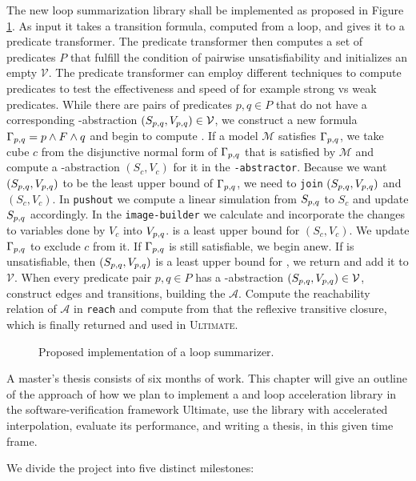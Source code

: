 
The new \qvasrs loop summarization library shall be implemented as proposed in Figure \ref{fig}. As input it takes a transition formula, computed from a loop, and gives it to a predicate transformer. The predicate transformer then computes a set of predicates $P$ that fulfill the condition of pairwise unsatisfiability and initializes an empty \qvasrs $\mathcal{V}$. The predicate transformer can employ different techniques to compute predicates to test the effectiveness and speed of for example strong vs weak predicates. While there are pairs of predicates $p, q \in P$ that do not have a corresponding \qvasr-abstraction $(S_{p, q}, V_{p, q}) \in \mathcal{V}$, we construct a new formula $\Gamma_{p, q} = p\land F \land q$ and begin to compute \pqvasr. If a model $\mathcal{M}$ satisfies $\Gamma_{p, q}$, we take cube $c$ from the disjunctive normal form of $\Gamma_{p, q}$ that is satisfied by $\mathcal{M}$ and compute a \qvasr-abstraction $(S_c, V_c)$ for it in the \texttt{\qvasr-abstractor}. Because we want $(S_{p, q}, V_{p, q})$ to be the least upper bound of $\Gamma_{p, q}$, we need to \texttt{join} $(S_{p, q}, V_{p, q})$ and $(S_c, V_c)$. In \texttt{pushout} we compute a linear simulation from $S_{p, q}$ to $S_c$ and update $S_{p, q}$ accordingly. In the \texttt{image-builder} we calculate and incorporate the changes to variables done by $V_c$ into $V_{p, q}$. \pqvasr is a least upper bound for $(S_c, V_c)$. We update $\Gamma_{p, q}$ to exclude $c$ from it. If $\Gamma_{p, q}$ is still satisfiable, we begin anew.
If \pqformula is unsatisfiable, then $(S_{p, q}, V_{p, q})$ is a least upper bound for \pqformula, we return and add it to $\mathcal{V}$. When every predicate pair $p, q \in P$ has a \qvasr-abstraction $(S_{p, q}, V_{p, q}) \in \mathcal{V}$, construct edges and transitions, building the \qvasrs $\mathcal{A}$. Compute the reachability relation of $\mathcal{A}$ in \texttt{reach} and compute from that the reflexive transitive closure, which is finally returned and used in \textsc{Ultimate}.
\begin{figure}[H]
    
    \caption{Proposed implementation of a \qvasrs loop summarizer.}
    \label{fig}
\end{figure}

A master's thesis consists of six months of work. This chapter will give an outline of the approach of how we plan to implement a \qvasr and \qvasrs loop acceleration library in the software-verification framework Ultimate, use the library with accelerated interpolation, evaluate its performance, and writing a thesis, in this given time frame. \\ \par
We divide the project into five distinct milestones:

